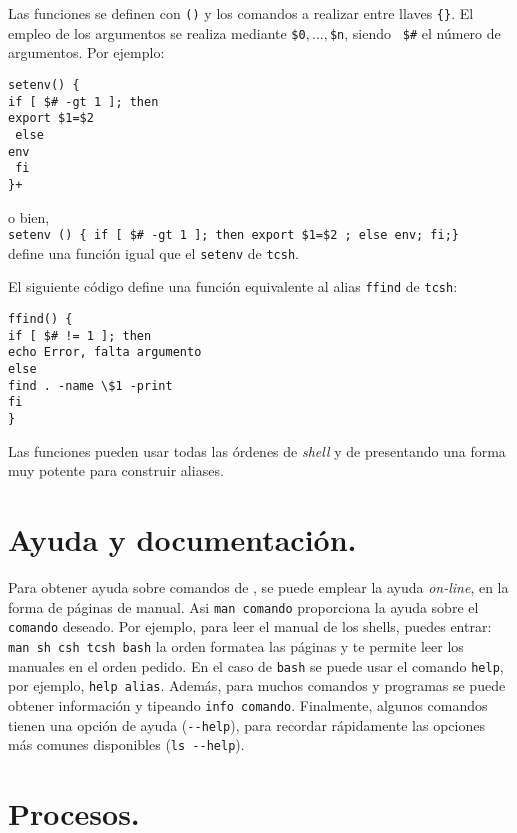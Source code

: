 Las funciones se definen con
\verb+()+ y los comandos a realizar entre llaves \verb+{}+.  El empleo
de los argumentos se realiza mediante \verb=$0=$,\dots,$\verb=$n=, siendo {\tt
  \$\#} el n{\'u}mero de argumentos.  Por ejemplo:

\begin{verbatim}
setenv() {
if [ $# -gt 1 ]; then
export $1=$2
 else
env
 fi 
}+
\end{verbatim}
o bien,\\
 \verb+setenv () { if [ $# -gt 1 ]; then export $1=$2 ; else env; fi;}+ \\
define una funci{\'o}n igual que el \verb+setenv+ de \verb+tcsh+. 

El
siguiente c\'odigo define una funci\'on equivalente al alias 
\verb+ffind+ de \verb+tcsh+:
\begin{verbatim}
ffind() {
if [ $# != 1 ]; then
echo Error, falta argumento 
else
find . -name \$1 -print 
fi 
}
\end{verbatim}

Las funciones pueden usar todas las {\'o}rdenes de {\it shell} y de
{\unix} presentando una forma muy potente para construir aliases.

\section{Ayuda y documentaci{\'o}n.}

Para obtener ayuda sobre comandos de {\unix}, se puede emplear la
ayuda {\it on-line}, en la forma de p{\'a}ginas de manual. Asi
\verb+man comando+ proporciona la ayuda sobre el \verb+comando+
deseado.  Por ejemplo, para leer el manual de los shells, puedes
entrar: \verb+man sh csh tcsh bash+ la orden formatea las p{\'a}ginas
y te permite leer los manuales en el orden pedido. En el caso de
\verb+bash+ se puede usar el comando \verb+help+, por ejemplo,
\verb+help alias+. Adem{\'a}s, para muchos comandos y programas se
puede obtener informaci{\'o}n y tipeando \verb+info comando+. 
Finalmente, algunos comandos tienen una opci\'on de ayuda
(\verb+--help+),
para recordar r\'apidamente las opciones m\'as comunes disponibles
(\verb+ls --help+).



\section{Procesos.}

